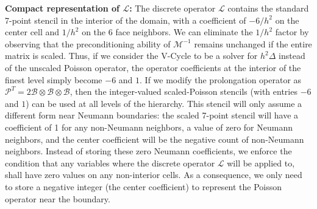 \noindent\textbf{Compact representation of $\mathcal{L}$:} The discrete operator $\mathcal{L}$ contains the standard 7-point stencil in the interior of the domain, with a
coefficient of $-6/h^2$ on the center cell and $1/h^2$ on the 6 face neighbors. We can eliminate the $1/h^2$ factor by observing that the preconditioning ability of $\mathcal{M}^{-1}$
remains unchanged if the entire matrix is scaled. Thus, if we consider the V-Cycle to be a solver for $h^2\Delta$ instead of the unscaled Poisson operator, the operator
coefficients at the interior of the finest level simply become $-6$ and $1$. 
If we
modify the prolongation operator as $\mathcal{P}^T\!=\!2\mathcal{B}\otimes\mathcal{B}\otimes\mathcal{B}$, then the integer-valued
scaled-Poisson stencils (with entries $-6$ and $1$) can be used at all levels of the hierarchy. This stencil will only assume a different form near Neumann boundaries: the scaled
7-point stencil will have a coefficient of 1 for any non-Neumann neighbors, a value of zero for Neumann neighbors, and the center coefficient will be the negative count of
non-Neumann neighbors. Instead of storing these zero Neumann coefficients, we enforce the condition that any variables where the discrete operator $\mathcal{L}$ will be applied to,
shall have zero values on any non-interior cells. As a consequence, we only need to store a negative integer (the center coefficient)  to represent the Poisson
operator near the boundary. 

